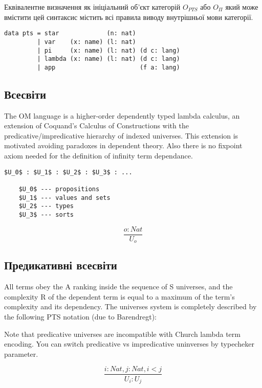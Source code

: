 Еквівалентне визначення як ініціальний об'єкт категорій $O_{PTS}$ або $O_\Pi$
який може вмістити цей синтаксис містить всі правила виводу
внутрішньої мови категорії.

\begin{lstlisting}[mathescape=true]
data pts = star             (n: nat)
         | var    (x: name) (l: nat)
         | pi     (x: name) (l: nat) (d c: lang)
         | lambda (x: name) (l: nat) (d c: lang)
         | app                       (f a: lang)
\end{lstlisting}


\subsection{Всесвіти}

The OM language is a higher-order dependently typed lambda calculus,
an extension of Coquand's Calculus of Constructions
with the predicative/impredicative hierarchy of indexed universes.
This extension is motivated avoiding paradoxes in dependent theory.
Also there is no fixpoint axiom needed for the definition
of infinity term dependance.

\begin{lstlisting}[mathescape=true]
    $U_0$ : $U_1$ : $U_2$ : $U_3$ : ...

    $U_0$ --- propositions
    $U_1$ --- values and sets
    $U_2$ --- types
    $U_3$ --- sorts
\end{lstlisting}

\begin{equation}
\tag{S}
\dfrac
{o : Nat}
{U_o}
\end{equation}

\newpage
\subsection*{Предикативні всесвіти}

All terms obey the A ranking inside the sequence of S universes,
and the complexity R of the dependent term is equal to a maximum of
the term's complexity and its dependency.
The universes system is completely described by the following
PTS notation (due to Barendregt):

Note that predicative universes are incompatible with Church lambda term encoding.
You can switch predicative vs impredicative uninverses by typecheker parameter.

\[
\tag{$A_1$}
\dfrac{i: Nat, j: Nat, i < j}{U_i : U_j}
\]

